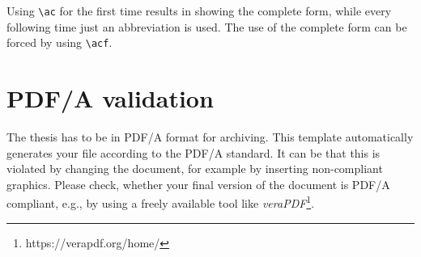 Using \texttt{\textbackslash ac} for the first time results in showing the complete form, while every following time just an abbreviation is used. The use of the complete form can be forced by using \texttt{\textbackslash acf}.

\section{PDF/A validation}

The thesis has to be in PDF/A format for archiving. This template automatically generates your file according to the PDF/A standard. It can be that this is violated by changing the document, for example by inserting non-compliant graphics. Please check, whether your final version of the document is PDF/A compliant, e.g., by using a freely available tool like \emph{veraPDF}\footnote{https://verapdf.org/home/}.

 

